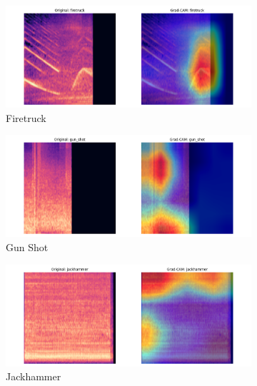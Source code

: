 \documentclass[11pt]{article}
\begin{document}
\begin{figure}[ht]
    \hfill
    \begin{subfigure}[b]{0.24\textwidth}
        \centering
        \includegraphics[width=\textwidth]{latex/assets/efficientnet_fold7_gradcam/gradcam_firetruck_0.png}
        \caption{Firetruck}
    \end{subfigure}
    \hfill
    \begin{subfigure}[b]{0.24\textwidth}
        \centering
        \includegraphics[width=\textwidth]{latex/assets/efficientnet_fold7_gradcam/gradcam_gun_shot_0.png}
        \caption{Gun Shot}
    \end{subfigure}
    \hfill
    \begin{subfigure}[b]{0.24\textwidth}
        \centering
        \includegraphics[width=\textwidth]{latex/assets/efficientnet_fold7_gradcam/gradcam_jackhammer_0.png}
        \caption{Jackhammer}
    \end{subfigure}
    \hfill
    \begin{subfigure}[b]{0.24\textwidth}

\end{subfigure}
\end{figure}
\end{document}
